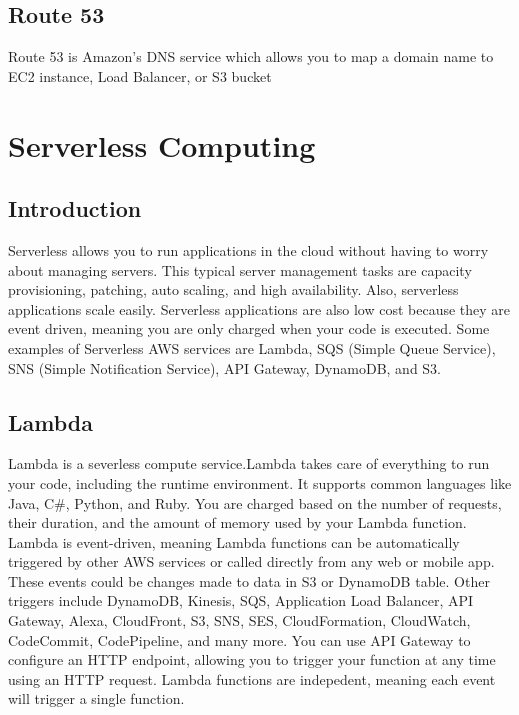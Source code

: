 \documentclass{article}%
\begin{document}
\subsection{Route 53}
Route 53 is Amazon's DNS service which allows you to map a domain name to EC2 instance, Load Balancer, or S3 bucket














 
\section{Serverless Computing}
\subsection{Introduction} Serverless allows you to run applications in the cloud without having to worry about managing servers. This typical server management tasks are capacity provisioning, patching, auto scaling, and high availability. Also, serverless applications scale easily.
Serverless applications are also low cost because they are event driven, meaning you are only charged when your code is executed.
Some examples of Serverless AWS services are Lambda, SQS (Simple Queue Service), SNS (Simple Notification Service), API Gateway, DynamoDB, and S3. 
\subsection{Lambda}
Lambda is a severless compute service.Lambda takes care of everything to run your code, including the runtime environment. It supports common languages like Java, C\#, Python, and Ruby. You are charged based on the number of requests, their duration, and the amount of memory used by your Lambda function. Lambda is event-driven, meaning Lambda functions can be automatically triggered by other AWS services or called directly from any web or mobile app. These events could be changes made to data in S3 or DynamoDB table. Other triggers include DynamoDB, Kinesis, SQS, Application Load Balancer, API Gateway, Alexa, CloudFront, S3, SNS, SES, CloudFormation, CloudWatch, CodeCommit, CodePipeline, and many more. You can use API Gateway to configure an HTTP endpoint, allowing you to trigger your function at any time using an HTTP request. 
Lambda functions are indepedent, meaning each event will trigger a single function. 
\end{document}
